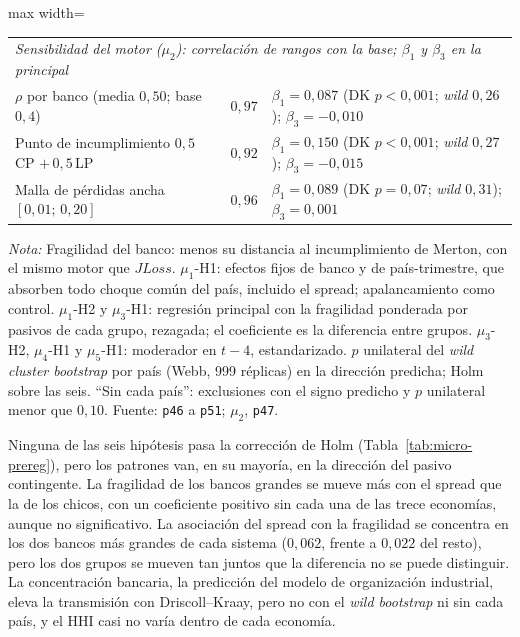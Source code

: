 \begin{table}[htbp]
\begin{adjustbox}{max width=\linewidth}
\begin{tabular}{l c c c c}
\multicolumn{5}{l}{\textit{Sensibilidad del motor ($\mu_{2}$): correlación de rangos con la base; $\beta_1$ y $\beta_3$ en la principal}} \\
\quad $\rho$ por banco (media $0{,}50$; base $0{,}4$) & $0{,}97$ & \multicolumn{3}{l}{$\beta_1=0{,}087$ (DK $p<0{,}001$; \textit{wild} $0{,}26$); $\beta_3=-0{,}010$} \\
\quad Punto de incumplimiento $0{,}5\,$CP $+\,0{,}5\,$LP & $0{,}92$ & \multicolumn{3}{l}{$\beta_1=0{,}150$ (DK $p<0{,}001$; \textit{wild} $0{,}27$); $\beta_3=-0{,}015$} \\
\quad Malla de pérdidas ancha $[0{,}01;\,0{,}20]$ & $0{,}96$ & \multicolumn{3}{l}{$\beta_1=0{,}089$ (DK $p=0{,}07$; \textit{wild} $0{,}31$); $\beta_3=0{,}001$} \\
\bottomrule
\end{tabular}
\end{adjustbox}
\par\smallskip\parbox{0.95\linewidth}{\footnotesize \textit{Nota:} Fragilidad del banco: menos su distancia al incumplimiento de Merton, con el mismo motor que $JLoss$. $\mu_{1}$-H1: efectos fijos de banco y de país-trimestre, que absorben todo choque común del país, incluido el spread; apalancamiento como control. $\mu_{1}$-H2 y $\mu_{3}$-H1: regresión principal con la fragilidad ponderada por pasivos de cada grupo, rezagada; el coeficiente es la diferencia entre grupos. $\mu_{3}$-H2, $\mu_{4}$-H1 y $\mu_{5}$-H1: moderador en $t-4$, estandarizado. $p$ unilateral del \textit{wild cluster bootstrap} por país (Webb, 999 réplicas) en la dirección predicha; Holm sobre las seis. ``Sin cada país'': exclusiones con el signo predicho y $p$ unilateral menor que $0{,}10$. Fuente: \texttt{p46} a \texttt{p51}; $\mu_{2}$, \texttt{p47}.}
\end{table}

Ninguna de las seis hipótesis pasa la corrección de Holm (Tabla~\ref{tab:micro-prereg}), pero los patrones van, en su mayoría, en la dirección del pasivo contingente. La fragilidad de los bancos grandes se mueve más con el spread que la de los chicos, con un coeficiente positivo sin cada una de las trece economías, aunque no significativo. La asociación del spread con la fragilidad se concentra en los dos bancos más grandes de cada sistema ($0{,}062$, frente a $0{,}022$ del resto), pero los dos grupos se mueven tan juntos que la diferencia no se puede distinguir. La concentración bancaria, la predicción del modelo de organización industrial, eleva la transmisión con Driscoll--Kraay, pero no con el \textit{wild bootstrap} ni sin cada país, y el HHI casi no varía dentro de cada economía.

